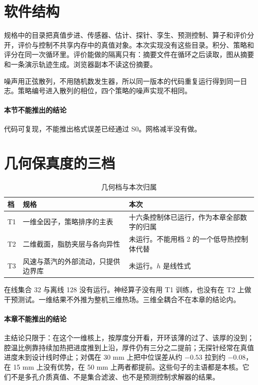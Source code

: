 \section{软件结构}

规格中的目录把真值步进、传感器、估计、探针、孪生、预测控制、算子和评价分开，评价与控制不共享内存中的真值对象。本次实现没有这些目录。积分、策略和评分在同一次循环里。评价能做的隔离只有：摘要文件在循环之后读取，图从摘要和一条演示轨迹生成。浏览器副本不读这份摘要。

噪声用正弦散列，不用随机数发生器，所以同一版本的代码重复运行得到同一日志。策略编号进入散列的相位，四个策略的噪声实现不相同。

\paragraph{本节不能推出的结论}
代码可复现，不能推出格式误差已经通过 S0。网格减半没有做。

\section{几何保真度的三档}

\begin{table}[ht]
\centering
\caption{几何档与本次归属}
\begin{tabularx}{\textwidth}{llX}
\toprule
档 & 规格 & 本次 \\
\midrule
T1 & 一维全因子，策略排序的主表 & 十六条控制体已运行，作为本章全部数字的归属 \\
T2 & 二维截面，脂肪夹层与各向异性 & 未运行。不能用档 2 的一个低导热控制体代替 \\
T3 & 风速与蒸汽的外部流动，只提供边界库 & 未运行。\(h\) 是线性式 \\
\bottomrule
\end{tabularx}
\end{table}

在线集合 32 与离线 128 没有运行。神经算子没有用 T1 训练，也没有在 T2 上做干预测试。一维结果不外推为整机三维热场。三维全耦合不在本章的结论内。

\paragraph{本章不能推出的结论}
主结论只限于：在这个一维核上，按厚度分开看，开环该薄的过了、该厚的没到；腔温比例靠持续加热把进度推到上沿，厚件仍有三分之二提前；无探针经常在真值进度未到设计线时停止；对偶在 30 mm 上把中位误差从约 \(-0.53\) 拉到约 \(-0.08\)，在 15 mm 上没有优势，在 50 mm 上两者都提前。这些句子的主语都是本核。它们不是多孔介质真值、不是集合滤波、也不是预测控制求解器的结果。
